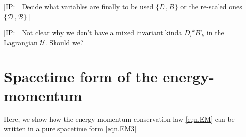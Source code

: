\documentclass[
10pt, %
a4paper, %
oneside, %
headinclude,footinclude, %
BCOR5mm, %
]{scrartcl}
\newcommand{\IP}[1]{{\color{Red}[IP:\ \ #1]}}
\newcommand{\sA}{\mathsmaller A}
\newcommand{\tetrsymbol}{h}
\newcommand{\tetr}[2]{\tetrsymbol^{#1}_{\phantom{#1}#2}}
\newcommand{\ET}[2]{E^{#1}_{\phantom{#1}#2}}	%
\newcommand{\dT}[2]{D_{#1}^{\phantom{#1}\,#2}}	%
\newcommand{\ddT}[2]{\mathcal{D}_{#1}^{\phantom{#1}\,#2}}	%
\newcommand{\BT}[2]{B^{#1#2}}	%
\newcommand{\bT}[2]{B^{#1#2}}	%
\newcommand{\bbT}[2]{\mathcal{B}^{#1#2}}	%
\newcommand{\hT}[2]{H_{#1#2}}	%
\newcommand{\LagBE}{\mathcal{L}}%
\newcommand{\LagST}{\mathcal{U}}%
\begin{document}


\IP{Decide what variables are finally to be used $ \{\dT{}{},\bT{}{}\} $ or the re-scaled ones $ 
\{\ddT{}{},\bbT{}{}\} $ }

\IP{Not clear why we don't have a mixed invariant kinda $ \dT{i}{k} B^i_{\ k} $ in the 
Lagrangian $ \LagST $. Should we?}
\appendix


\section{Spacetime form of the energy-momentum}\label{app.sec.EM}

Here, we show how the energy-momentum conservation law \eqref{eqn.EM} can be written in a pure 
spacetime form \eqref{eqn.EM3}.
\end{document}
